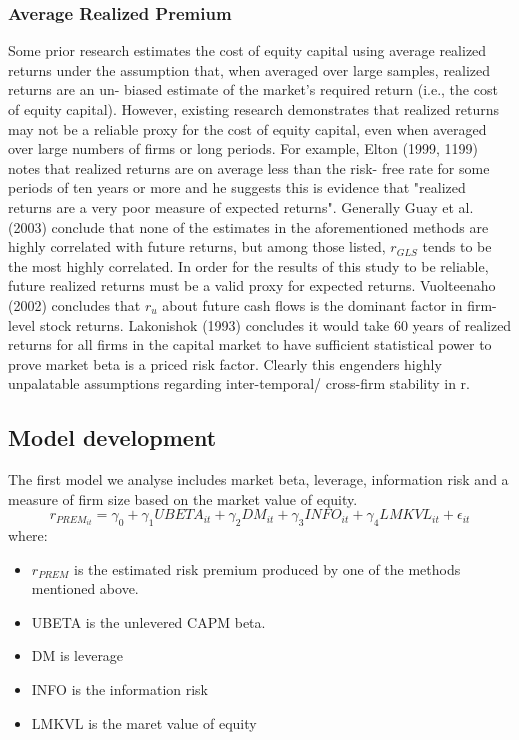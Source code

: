 \documentclass[12 pt]{article}
\begin{document}
\subsubsection{Average Realized Premium} 
Some prior research estimates the cost of equity capital using average realized returns
under the assumption that, when averaged over large samples, realized returns are an un-
biased estimate of the market's required return (i.e., the cost of equity capital). However,
existing research demonstrates that realized returns may not be a reliable proxy for the cost
of equity capital, even when averaged over large numbers of firms or long periods. For
example, Elton (1999, 1199) notes that realized returns are on average less than the risk-
free rate for some periods of ten years or more and he suggests this is evidence that
"realized returns are a very poor measure of expected returns". Generally Guay et al. (2003) conclude that none of the estimates in the aforementioned methods are highly
correlated with future returns, but among those listed, $r_{GLS}$ tends to be the most highly
correlated. In order for the results of this study to be reliable, future realized returns must
be a valid proxy for expected returns. Vuolteenaho (2002) concludes that
$r_u$ about future cash flows is the dominant factor in firm-level stock returns. Lakonishok (1993) concludes it would take 60 years of realized returns for all firms in the
capital market to have sufficient statistical power to prove market beta is a priced risk
factor. Clearly this engenders highly unpalatable assumptions regarding inter-temporal/
cross-firm stability in r.
\subsection{Model development}
The first model we analyse includes market beta, leverage, information risk and a measure of firm size based on the market value of equity. 
\[
r_{PREM_{it}} = \gamma_0+\gamma_1UBETA_{it}+\gamma_2DM_{it}+\gamma_3INFO_{it}+\gamma_4LMKVL_{it}+\epsilon_{it}
\]
where:
\begin{itemize}
\item $r_{PREM}$ is the estimated risk premium produced by one of the methods mentioned above. 
\item UBETA is the unlevered CAPM beta.
\item DM is leverage
\item INFO is the information risk 
\item LMKVL is the maret value of equity 
\end{itemize}
\end{document}
